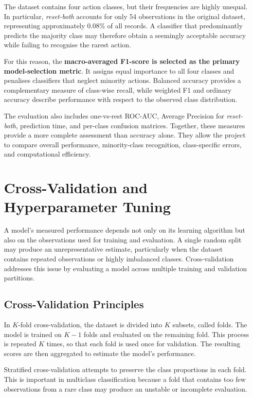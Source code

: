 The dataset contains four action classes, but their frequencies are highly unequal. In particular, \emph{reset-both} accounts for only 54 observations in the original dataset, representing approximately 0.08\% of all records. A classifier that predominantly predicts the majority class may therefore obtain a seemingly acceptable accuracy while failing to recognise the rarest action.

For this reason, the \textbf{macro-averaged F1-score is selected as the primary model-selection metric}. It assigns equal importance to all four classes and penalises classifiers that neglect minority actions. Balanced accuracy provides a complementary measure of class-wise recall, while weighted F1 and ordinary accuracy describe performance with respect to the observed class distribution.

The evaluation also includes one-vs-rest ROC-AUC, Average Precision for \emph{reset-both}, prediction time, and per-class confusion matrices. Together, these measures provide a more complete assessment than accuracy alone. They allow the project to compare overall performance, minority-class recognition, class-specific errors, and computational efficiency.

\section{Cross-Validation and Hyperparameter Tuning}

A model's measured performance depends not only on its learning algorithm but also on the observations used for training and evaluation. A single random split may produce an unrepresentative estimate, particularly when the dataset contains repeated observations or highly imbalanced classes. Cross-validation addresses this issue by evaluating a model across multiple training and validation partitions.

\subsection{Cross-Validation Principles}

In $K$-fold cross-validation, the dataset is divided into $K$ subsets, called folds. The model is trained on $K-1$ folds and evaluated on the remaining fold. This process is repeated $K$ times, so that each fold is used once for validation. The resulting scores are then aggregated to estimate the model's performance.

Stratified cross-validation attempts to preserve the class proportions in each fold. This is important in multiclass classification because a fold that contains too few observations from a rare class may produce an unstable or incomplete evaluation.

